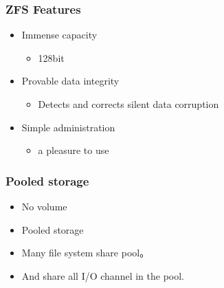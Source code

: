 \begin{frame}[fragile]
    \frametitle{ZFS Features}
    \begin{itemize}
        \item Immense capacity
        \begin{itemize}
            \item 128bit
        \end{itemize}
        \item Provable data integrity
        \begin{itemize}
            \item Detects and corrects silent data corruption
        \end{itemize}
        \item Simple administration
        \begin{itemize}
            \item a pleasure to use
        \end{itemize}
    \end{itemize}
\end{frame}
% 
% 
\begin{frame}[fragile]
    \frametitle{Pooled storage}
    \begin{itemize}
        \item No volume
        \item Pooled storage
        \item Many file system share pool。
        \item And share all I/O channel in the pool.
    \end{itemize}
\end{frame}
% 
